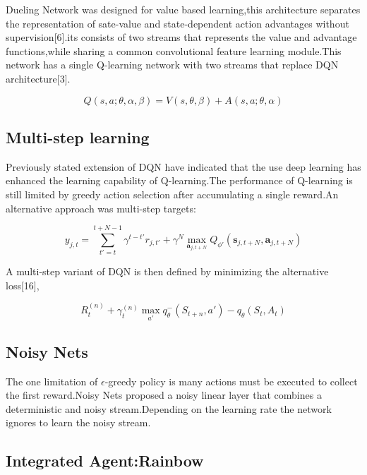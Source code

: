 Dueling Network was designed for  value based learning,this architecture separates the representation of sate-value and state-dependent action advantages without supervision[6].its consists of two streams that represents the value and advantage functions,while sharing a common convolutional feature learning module.This network has a single Q-learning network with two streams that replace DQN architecture[3]. 

\begin{equation}
    Q(s,a; \theta,\alpha,\beta) = V(s,\theta,\beta) + A(s,a; \theta,\alpha)
\end{equation}


\subsection{Multi-step learning}

Previously stated extension of DQN have indicated that the use deep learning has enhanced the learning capability of Q-learning.The performance of  Q-learning is still limited by greedy action selection after accumulating a single reward.An alternative approach was multi-step targets:
 
 \begin{equation}
		y_{j,t} = \sum_{t'=t}^{t+N-1} \gamma^{t-t'}    r_{j,t'} + \gamma^N  \max_{\bm{a}_{j,t+N}}Q_{\phi'}(\bm{s}_{j,t+N}, \bm{a}_{j,t+N}) 
\end{equation}

A multi-step variant of DQN is then defined by minimizing
the alternative loss[16],

\begin{equation}
	    R_t^{(n)} +  \gamma_t^{(n)}  \max_{a'} q_\theta^{-}(S_{t+n},a') - q_{\theta}(S_t,A_t)
\end{equation}
  

\subsection{Noisy Nets}

The one limitation of $\mathcal{\epsilon}$-greedy policy  is many actions must be executed to collect the first reward.Noisy Nets proposed a noisy linear layer that combines  a deterministic and noisy stream.Depending on the learning rate the network ignores to learn the noisy stream.

\subsection{Integrated Agent:Rainbow}


